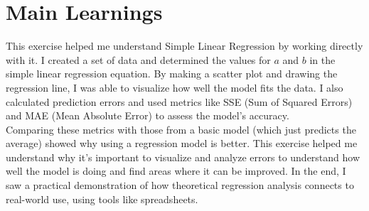 \documentclass{article}
\begin{document}
\thispagestyle{empty}

\titleBC




\section{Main Learnings}

This exercise helped me understand Simple Linear Regression by working directly with it. I created a set of data and determined the values for $a$ and $b$ in the simple linear regression equation. By making a scatter plot and drawing the regression line, I was able to visualize how well the model fits the data. I also calculated prediction errors and used metrics like SSE (Sum of Squared Errors) and MAE (Mean Absolute Error) to assess the model's accuracy. \\

Comparing these metrics with those from a basic model (which just predicts the average) showed why using a regression model is better. This exercise helped me understand why it's important to visualize and analyze errors to understand how well the model is doing and find areas where it can be improved. In the end, I saw a practical demonstration of how theoretical regression analysis connects to real-world use, using tools like spreadsheets.
\end{document}
